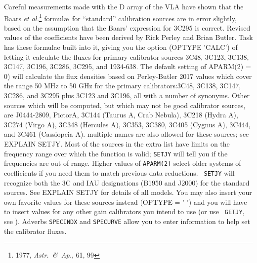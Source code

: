 

      Careful measurements made with the D array of the VLA have shown
that the Baars {\it et al.\/}\footnote{1977, {\it Astr.~\&\ Ap.}, 61,
99} formul\ae\ for ``standard'' calibration sources are in error
slightly, based on the assumption that the Baars' expression for 3C295
is correct.   Revised values of the coefficients have been derived by
Rick Perley and Brian Butler.  Task {\tt {}} has these
formulae built into it, giving you the option ({\us OPTYPE 'CALC'}) of
letting it calculate the fluxes for primary calibrator sources 3C48,
3C123, 3C138, 3C147, 3C196, 3C286, 3C295, and 1934-638.  The default
setting of {\us APARM(2) = 0}) will calculate the flux densities based
on Perley-Butler 2017 values which cover the range 50 MHz to 50 GHz
for the primary calibrators:3C48, 3C138, 3C147, 3C286, and 3C295 plus
3C123 and 3C196, all with a number of synonyms.  Other sources which
will be computed, but which may not be good calibrator sources,
are J0444-2809, PictorA, 3C144 (Taurus A, Crab Nebula), 3C218 (Hydra
A), 3C274 (Virgo A), 3C348 (Hercules A), 3C353, 3C380, 3C405 (Cygnus
A), 3C444, and 3C461 (Cassiopeia A).  multiple names are also allowed
for these sources; see {\us EXPLAIN SETJY}\@.  Most of the sources in
the extra list have limits on the frequency range over which the
function is valid; {\tt SETJY} will tell you if the frequencies are
out of range.  Higher values of {\tt APARM(2)} select older systems of
coefficients if you need them to match previous data reductions.  {\tt
SETJY} will recognize both the 3C and IAU designations (B1950 and
J2000) for the standard sources.  See {\us EXPLAIN SETJY} for details
of all models.  You may also insert your own favorite values for these
sources instead ({\us OPTYPE = ' '}) and you will have to insert
values for any other gain calibrators you intend to use (or use {\tt
GETJY}, see ).  Adverbs {\tt SPECINDX} and {\tt SPECURVE}
allow you to enter  information to help set the
calibrator fluxes.

